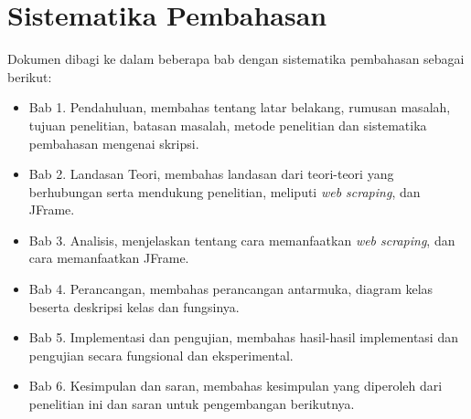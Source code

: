 \section{Sistematika Pembahasan}
\label{sec:sispem}
Dokumen dibagi ke dalam beberapa bab dengan sistematika pembahasan sebagai berikut:
    \begin{itemize}
        \item Bab 1. Pendahuluan, membahas tentang latar belakang, rumusan masalah, tujuan penelitian, batasan masalah, metode penelitian dan sistematika pembahasan mengenai skripsi.
        \item Bab 2. Landasan Teori, membahas landasan dari teori-teori yang berhubungan serta mendukung penelitian, meliputi \textit{web scraping}, dan JFrame. 
        \item Bab 3. Analisis, menjelaskan tentang cara memanfaatkan \textit{web scraping}, dan cara memanfaatkan JFrame.
        \item Bab 4. Perancangan, membahas perancangan antarmuka, diagram kelas beserta deskripsi kelas dan fungsinya.
        \item Bab 5. Implementasi dan pengujian, membahas hasil-hasil implementasi dan pengujian secara fungsional dan eksperimental.
        \item Bab 6. Kesimpulan dan saran, membahas kesimpulan yang diperoleh dari penelitian ini dan saran untuk pengembangan berikutnya.
    \end{itemize}
